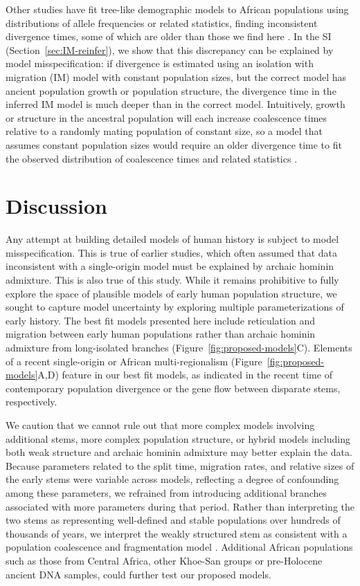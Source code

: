 \documentclass[]{article}
\begin{document}
Other studies have fit tree-like demographic models to African populations
using distributions of allele frequencies or related statistics, finding
inconsistent divergence times, some of which are older than those we find here
\cite{Henn2018-rf,Bergstrom2021-iw}. In the SI (Section~\ref{sec:IM-reinfer}),
we show that this discrepancy can be explained by model misspecification: if
divergence is estimated using an isolation with migration (IM) model with
constant population sizes, but the correct model has ancient population growth
or population structure, the divergence time in the inferred IM model is much
deeper than in the correct model. Intuitively, growth or structure in the
ancestral population will each increase coalescence times relative to a
randomly mating population of constant size, so a model that assumes constant
population sizes would require an older divergence time to fit the observed
distribution of coalescence times and related statistics
\citep{Momigliano2021-th,Shchur2022-wa}.  

\section*{Discussion}

Any attempt at building detailed models of human history is subject to model
misspecification. This is true of earlier studies, which often assumed that
data inconsistent with a single-origin model must be explained by archaic
hominin admixture. This is also true of this study. While it remains
prohibitive to fully explore the space of plausible models of early human
population structure, we sought to capture model uncertainty by exploring
multiple parameterizations of early history. The best fit models presented here
include reticulation and migration between early human populations rather than
archaic hominin admixture from long-isolated branches
(Figure~\ref{fig:proposed-models}C). Elements of a recent single-origin or
African multi-regionalism (Figure~\ref{fig:proposed-models}A,D) feature in our
best fit models, as indicated in the recent time of contemporary population
divergence or the gene flow between disparate stems, respectively.

We caution that we cannot rule out that more complex models involving
additional stems, more complex population structure, or hybrid models including
both weak structure and archaic hominin admixture may better explain the data.
Because parameters related to the split time, migration rates, and relative
sizes of the early stems were variable across models, reflecting a degree of
confounding among these parameters, we refrained from introducing additional
branches associated with more parameters during that period. Rather than
interpreting the two stems as representing well-defined and stable populations
over hundreds of thousands of years, we interpret the weakly structured stem as
consistent with a population coalescence and fragmentation model
\citep{Scerri2019-xg}. Additional African populations such as those from
Central Africa, other Khoe-San groups or pre-Holocene ancient DNA samples,
could further test our proposed models.
\end{document}
